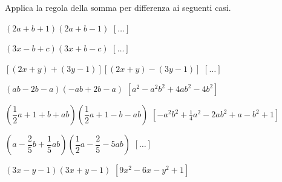 
\begin{esercizio}[\Ast]
 \label{ese:11.21}
Applica la regola della somma per differenza ai seguenti casi.

\begin{enumeratea}
\item \((2a+b+1)(2a+b-1)\)
  \hfill \(\left[ \dots \right]\)
\item \((3x-b+c)(3x+b-c)\)
  \hfill \(\left[ \dots \right]\)
\item \(\left[(2x+y)+(3y-1)\right]\left[(2x+y)-(3y-1)\right]\)
  \hfill \(\left[ \dots \right]\)
\item \((ab-2b-a)(-{ab}+2b-a)\)
  \hfill \(\left[a^{2}-a^{2}b^{2}+4{ab}^{2}-4b^{2}\right]\)
\item \(\left(\dfrac{1}{2}a+1+b+ab\right)\left(\dfrac{1}{2}a+1-b-ab\right)\)
  \hfill \(\left[-a^{2}b^{2}+\frac{1}{4}a^{2}-2{ab}^{2}+a-b^{2}+1\right]\)
\item \(\left(a-\dfrac{2}{5}b+\dfrac{1}{5}{ab}\right)
       \left(\dfrac{1}{2}a-\dfrac{2}{5}-5{ab}\right)\)
  \hfill \(\left[ \dots \right]\)
\item \((3x-y-1)(3x+y-1)\)
  \hfill \(\left[9x^{2}-6x-y^{2}+1\right]\)
\end{enumeratea}
\end{esercizio}

